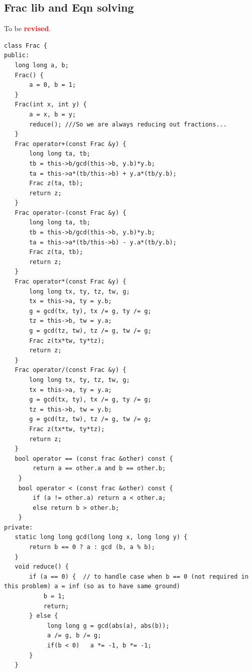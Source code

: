\documentclass[8pt, a4paper, oneside, twocolumn]{extarticle}
\newcommand{\revised}{To be \textcolor{red}{\textbf{revised}}.}
\begin{document}
\subsection{Frac lib and Eqn solving}
\revised
\begin{verbatim}
class Frac {
public:
   long long a, b;
   Frac() {
       a = 0, b = 1;
   }
   Frac(int x, int y) {
       a = x, b = y;
       reduce(); ///So we are always reducing out fractions...
   }
   Frac operator+(const Frac &y) {
       long long ta, tb;
       tb = this->b/gcd(this->b, y.b)*y.b;
       ta = this->a*(tb/this->b) + y.a*(tb/y.b);
       Frac z(ta, tb);
       return z;
   }
   Frac operator-(const Frac &y) {
       long long ta, tb;
       tb = this->b/gcd(this->b, y.b)*y.b;
       ta = this->a*(tb/this->b) - y.a*(tb/y.b);
       Frac z(ta, tb);
       return z;
   }
   Frac operator*(const Frac &y) {
       long long tx, ty, tz, tw, g;
       tx = this->a, ty = y.b;
       g = gcd(tx, ty), tx /= g, ty /= g;
       tz = this->b, tw = y.a;
       g = gcd(tz, tw), tz /= g, tw /= g;
       Frac z(tx*tw, ty*tz);
       return z;
   }
   Frac operator/(const Frac &y) {
       long long tx, ty, tz, tw, g;
       tx = this->a, ty = y.a;
       g = gcd(tx, ty), tx /= g, ty /= g;
       tz = this->b, tw = y.b;
       g = gcd(tz, tw), tz /= g, tw /= g;
       Frac z(tx*tw, ty*tz);
       return z;
   }
   bool operator == (const frac &other) const {
        return a == other.a and b == other.b;
    }
    bool operator < (const frac &other) const {
        if (a != other.a) return a < other.a;
        else return b > other.b;
    }
private:
   static long long gcd(long long x, long long y) {
       return b == 0 ? a : gcd (b, a % b);
   }
   void reduce() {
       if (a == 0) {  // to handle case when b == 0 (not required in this problem) a = inf (so as to have same ground)
           b = 1;
           return;
       } else {
            long long g = gcd(abs(a), abs(b));
            a /= g, b /= g;
            if(b < 0)   a *= -1, b *= -1;
       }
   }
    

\end{verbatim}
\end{document}
